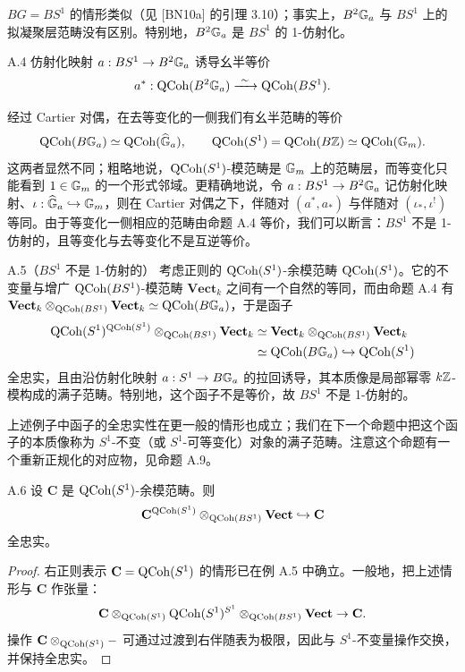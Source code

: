 $BG=BS^1$ 的情形类似（见 [BN10a] 的引理 3.10）；事实上，$B^2\mathbb{G}_a$ 与 $BS^1$ 上的拟凝聚层范畴没有区别。特别地，$B^2\mathbb{G}_a$ 是 $BS^1$ 的 1-仿射化。

\begin{prop}{A.4}\label{prop:a5-03-A-4}
仿射化映射 $a:BS^1\to B^2\mathbb{G}_a$ 诱导幺半等价
\[
a^*:\QCoh(B^2\GG_a)\xrightarrow{\ \sim\ }\QCoh(BS^1).
\]
\end{prop}

经过 Cartier 对偶，在去等变化的一侧我们有幺半范畴的等价
\[
\operatorname{QCoh}(B\mathbb{G}_a)\simeq\operatorname{QCoh}(\widehat{\mathbb{G}}_a),\qquad \operatorname{QCoh}(S^1)=\operatorname{QCoh}(B\mathbb{Z})\simeq\operatorname{QCoh}(\mathbb{G}_m).
\]
这两者显然不同；粗略地说，$\operatorname{QCoh}(S^1)$-模范畴是 $\mathbb{G}_m$ 上的范畴层，而等变化只能看到 $1\in\mathbb{G}_m$ 的一个形式邻域。更精确地说，令 $a:BS^1\to B^2\mathbb{G}_a$ 记仿射化映射、$\iota:\widehat{\mathbb{G}}_a\hookrightarrow\mathbb{G}_m$，则在 Cartier 对偶之下，伴随对 $(a^*,a_*)$ 与伴随对 $(\iota_*,\iota^!)$ 等同。由于等变化一侧相应的范畴由命题 A.4 等价，我们可以断言：$BS^1$ 不是 1-仿射的，且等变化与去等变化不是互逆等价。

\begin{exam}{A.5}（$BS^1$ 不是 1-仿射的）\label{exam:a5-03-A-5}
考虑正则的 $\operatorname{QCoh}(S^1)$-余模范畴 $\operatorname{QCoh}(S^1)$。它的不变量与增广 $\operatorname{QCoh}(BS^1)$-模范畴 $\mathbf{Vect}_k$ 之间有一个自然的等同，而由命题 A.4 有 $\mathbf{Vect}_k\otimes_{\operatorname{QCoh}(BS^1)}\mathbf{Vect}_k\simeq\operatorname{QCoh}(B\mathbb{G}_a)$，于是函子
\[
\begin{aligned}
\operatorname{QCoh}(S^1)^{\operatorname{QCoh}(S^1)}\otimes_{\operatorname{QCoh}(BS^1)}\mathbf{Vect}_k
&\simeq\mathbf{Vect}_k\otimes_{\operatorname{QCoh}(BS^1)}\mathbf{Vect}_k\\
&\simeq \operatorname{QCoh}(B\mathbb{G}_a)\hookrightarrow\operatorname{QCoh}(S^1)
\end{aligned}
\]
全忠实，且由沿仿射化映射 $a:S^1\to B\mathbb{G}_a$ 的拉回诱导，其本质像是局部幂零 $k\mathbb{Z}$-模构成的满子范畴。特别地，这个函子不是等价，故 $BS^1$ 不是 1-仿射的。
\end{exam}

上述例子中函子的全忠实性在更一般的情形也成立；我们在下一个命题中把这个函子的本质像称为 $S^1$-不变（或 $S^1$-可等变化）对象的满子范畴。注意这个命题有一个重新正规化的对应物，见命题 A.9。

\begin{prop}{A.6}\label{prop:a5-03-A-6}
设 $\mathbf C$ 是 $\operatorname{QCoh}(S^1)$-余模范畴。则
\[
\mathbf C^{\operatorname{QCoh}(S^1)}\otimes_{\operatorname{QCoh}(BS^1)}\mathbf{Vect}\hookrightarrow\mathbf C
\]
全忠实。
\end{prop}

\begin{proof}
右正则表示 $\mathbf C=\operatorname{QCoh}(S^1)$ 的情形已在例 A.5 中确立。一般地，把上述情形与 $\mathbf C$ 作张量：
\[
\mathbf C\otimes_{\operatorname{QCoh}(S^1)}\operatorname{QCoh}(S^1)^{S^1}\otimes_{\operatorname{QCoh}(BS^1)}\mathbf{Vect}\to\mathbf C.
\]
操作 $\mathbf C\otimes_{\operatorname{QCoh}(S^1)}-$ 可通过过渡到右伴随表为极限，因此与 $S^1$-不变量操作交换，并保持全忠实。
\end{proof}

